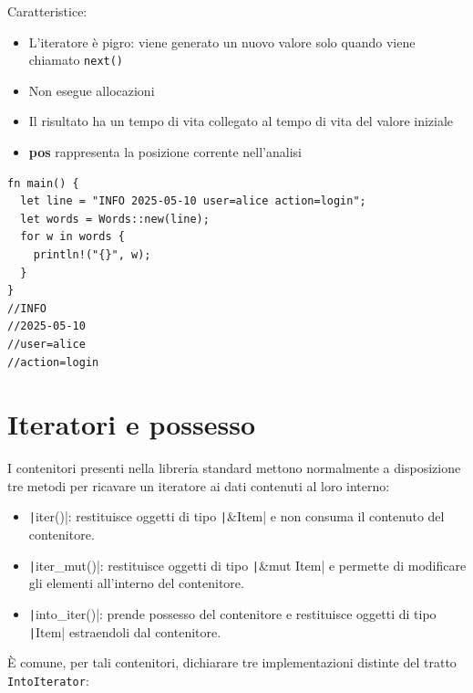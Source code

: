 \begin{flushleft}
  \begin{minipage}{0.47\linewidth}
    \raggedright
    Caratteristice:

    \begin{itemize}
      \item L'iteratore è pigro: viene generato un nuovo valore solo quando viene chiamato \verb|next()|
      \item Non esegue allocazioni
      \item Il risultato ha un tempo di vita collegato al tempo di vita del valore iniziale
      \item \textbf{pos} rappresenta la posizione corrente nell'analisi
    \end{itemize}

  \end{minipage}%
  \hfill
  \begin{minipage}{0.47\linewidth}
    \begin{verbatim}
fn main() {
  let line = "INFO 2025-05-10 user=alice action=login";
  let words = Words::new(line);
  for w in words {
    println!("{}", w);
  }
}
//INFO
//2025-05-10
//user=alice
//action=login
   \end{verbatim}
  \end{minipage}
\end{flushleft}


\section{Iteratori e possesso}
I contenitori presenti nella libreria standard mettono normalmente a disposizione tre metodi per ricavare
un iteratore ai dati contenuti al loro interno:

\begin{itemize}
  \item \texttt|iter()|: restituisce oggetti di tipo \texttt|&Item| e non consuma il
        contenuto del contenitore.
  \item \texttt|iter_mut()|: restituisce oggetti di tipo \texttt|&mut Item| e permette
        di modificare gli elementi all'interno del contenitore.
  \item \texttt|into_iter()|: prende possesso del contenitore e restituisce oggetti di tipo
        \texttt|Item| estraendoli dal contenitore.
\end{itemize}

È comune, per tali contenitori, dichiarare tre implementazioni distinte del tratto \verb|IntoIterator|:

